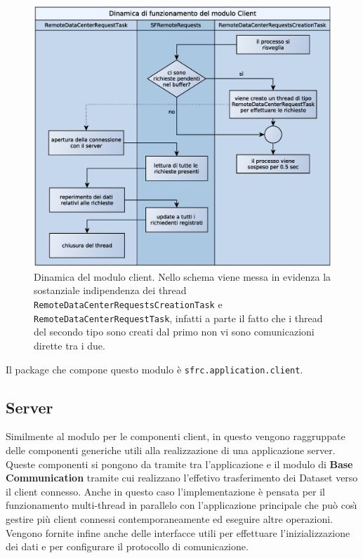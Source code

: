 \begin{figure}
\begin{center}
\includegraphics[width=\textwidth]{Immagini/DinamicaClient}
\caption{Dinamica del modulo client. Nello schema viene messa in evidenza la sostanziale indipendenza dei thread \texttt{RemoteDataCenterRequestsCreationTask} e \texttt{RemoteDataCenterRequestTask}, infatti a parte il fatto che i thread del secondo tipo sono creati dal primo non vi sono comunicazioni dirette tra i due.\label{f:dinamicaclient}} 
\end{center} 
\end{figure}


Il package che compone questo modulo \`e \texttt{sfrc.application.client}.

\subsection{Server}
\label{sub:servermodule}
Similmente al modulo per le componenti client, in questo vengono raggruppate delle componenti generiche utili alla realizzazione di una applicazione server. Queste componenti si pongono da tramite tra l'applicazione e il modulo di \textbf{Base Communication} tramite cui realizzano l'effetivo trasferimento dei Dataset verso il client connesso.
Anche in questo caso l'implementazione \`e pensata per il funzionamento multi-thread in parallelo con l'applicazione principale che pu\`o cos{\`\i} gestire pi\`u client connessi contemporaneamente ed eseguire altre operazioni.
Vengono fornite infine anche delle interfacce utili per effettuare l'inizializzazione dei dati e per configurare il protocollo di comunicazione.

